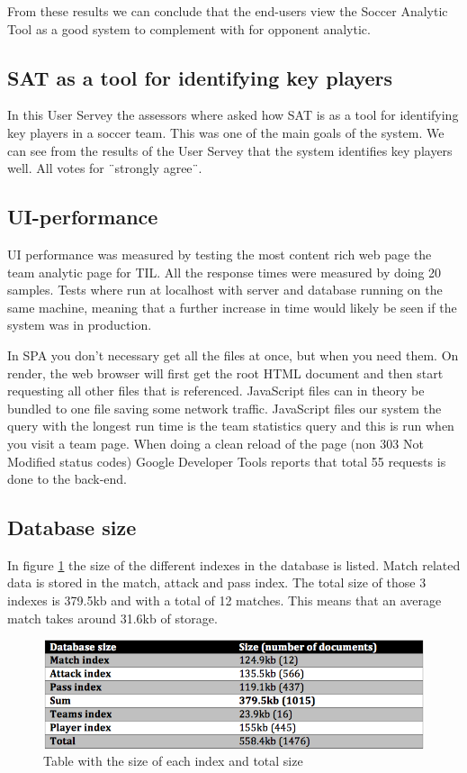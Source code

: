 From these results we can conclude that the end-users view the Soccer Analytic Tool as a good system to complement with for opponent analytic.

\subsection{SAT as a tool for identifying key players}

In this User Servey the assessors where asked how SAT is as a tool for identifying key players in a soccer team. This was one of the main goals of the system. We can see from the results of the User Servey that the system identifies key players well. All votes for ¨strongly agree¨. 

\subsection{UI-performance}
UI performance was measured by testing the most content rich web page the team analytic page for \ac{TIL}. All the response times were measured by doing 20 samples. Tests where run at localhost with server and database running on the same machine, meaning that a further increase in time would likely be seen if the system was in production. 

In \ac{SPA} you don’t necessary get all the files at once, but when you need them. On render, the web browser will first get the root \ac{HTML} document and then start requesting all other files that is referenced. JavaScript files can in theory be bundled to one file saving some network traffic. JavaScript files our system the query with the longest run time is the team statistics query and this is run when you visit a team page. When doing a clean reload of the page (non 303 Not Modified status codes) Google Developer Tools reports that total 55 requests is done to the back-end.

\subsection{Database size}
In figure \ref{fig:dbsize} the size of the different indexes in the database is listed. Match related data is stored in the match, attack and pass index. The total size of those 3 indexes is 379.5kb and with a total of 12 matches. This means that an average match takes around 31.6kb of storage.

\begin{figure}[ht!]
\centering
\includegraphics[width=1\textwidth]{images/evaluation/dbsize}
\caption{Table with the size of each index and total size}
\label{fig:dbsize}
\end{figure}


